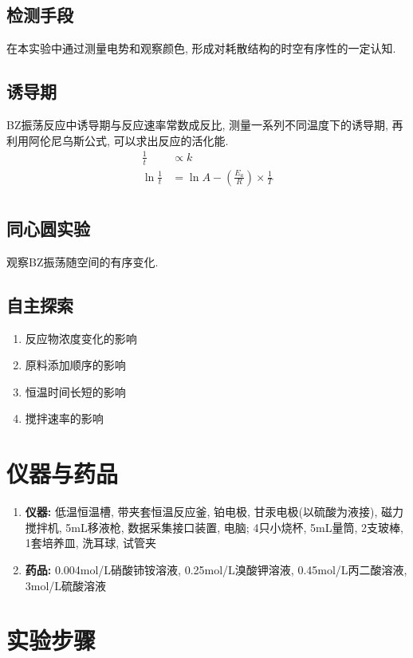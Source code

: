 \documentclass[a4paper]{article}
\begin{document}
\subsection{检测手段}
在本实验中通过测量电势和观察颜色, 形成对耗散结构的时空有序性的一定认知.
\subsection{诱导期}
BZ振荡反应中诱导期与反应速率常数成反比, 测量一系列不同温度下的诱导期, 
再利用阿伦尼乌斯公式, 可以求出反应的活化能.\\
\begin{equation}
	\begin{aligned}
		\frac{1}{t} &\propto k\\
		\ln{\frac{1}{t}} &= \ln{A} - (\frac{E_{a}}{R})\times \frac{1}{T}\\
	\end{aligned}
\end{equation}
\subsection{同心圆实验}
观察BZ振荡随空间的有序变化. 
\subsection{自主探索}
\begin{enumerate}
	\item 反应物浓度变化的影响
	\item 原料添加顺序的影响
	\item 恒温时间长短的影响
	\item 搅拌速率的影响
\end{enumerate}
\section{仪器与药品}
\begin{enumerate}
    \item \textbf{仪器:} 低温恒温槽, 带夹套恒温反应釜, 铂电极, 甘汞电极(以硫酸为液接),
		磁力搅拌机, 5mL移液枪, 数据采集接口装置, 电脑; 4只小烧杯, 5mL量筒, 2支玻棒, 1套培养皿, 洗耳球, 试管夹
    \item \textbf{药品:} 0.004mol/L硝酸铈铵溶液, 0.25mol/L溴酸钾溶液, 0.45mol/L丙二酸溶液, 3mol/L硫酸溶液
\end{enumerate}
\section{实验步骤}
\end{document}
